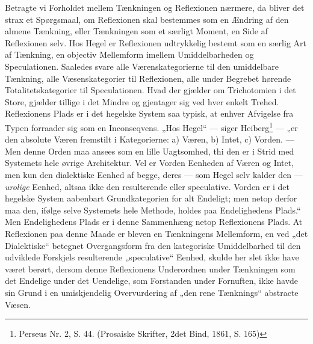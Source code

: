 \documentclass[11pt]{book}
\newcommand{\opage}[1]{\marginnote{\footnotesize\textit{[#1]}}}
\begin{document}
Betragte vi Forholdet mellem Tænkningen og Reflexionen nærmere, da bliver
det strax et Spørgsmaal, om Reflexionen skal bestemmes som en Ændring af
den almene Tænkning, eller Tænkningen som et særligt Moment, en Side af
Reflexionen selv. Hos Hegel er Reflexionen udtrykkelig bestemt som en
særlig Art af Tænkning, en objectiv Mellemform imellem Umiddelbarheden og
Speculationen. Saaledes svare alle Værenskategorierne til den umiddelbare
Tænkning, alle Væsenskategorier til Reflexionen, alle under Begrebet
hørende Totalitetskategorier til Speculationen. Hvad der gjælder om
Trichotomien i det Store, gjælder tillige i det Mindre og gjentager sig ved
hver enkelt Trehed. Reflexionens Plads er i det hegelske System saa typisk,
at enhver Afvigelse fra Typen forraader sig som en Inconseqvens. „Hos
Hegel“ --- siger Heiberg\footnote{Perseus Nr. 2, S. 44. (Prosaiske
Skrifter, 2det Bind, 1861, S. 165)} --- „er den absolute Væren fremstilt i
Kategorierne:
\opage{56} \setcounter{footnote}{0}%
a) Væren, b) Intet, c) Vorden. --- Men denne Orden maa ansees som en lille
Uagtsomhed, thi den er i Strid med Systemets hele øvrige Architektur. Vel
er Vorden Eenheden af Væren og Intet, men kun den dialektiske Eenhed af
begge, deres --- som Hegel selv kalder den --- \emph{urolige} Eenhed,
altsaa ikke den resulterende eller speculative. Vorden er i det hegelske
System aabenbart Grundkategorien for alt Endeligt; men netop derfor maa
den, ifølge selve Systemets hele Methode, holdes paa Endelighedens Plads.“
Men Endelighedens Plads er i denne Sammenhæng netop Reflexionens Plads. At
Reflexionen paa denne Maade er bleven en Tænkningens Mellemform, en ved
„det Dialektiske“ betegnet Overgangsform fra den kategoriske Umiddelbarhed
til den udviklede Forskjels resulterende „speculative“ Eenhed, skulde her
slet ikke have været berørt, dersom denne Reflexionens Underordnen under
Tænkningen som det Endelige under det Uendelige, som Forstanden under
Fornuften, ikke havde sin Grund i en umiskjendelig Overvurdering af „den
rene Tænknings“ abstracte Væsen.
\end{document}
